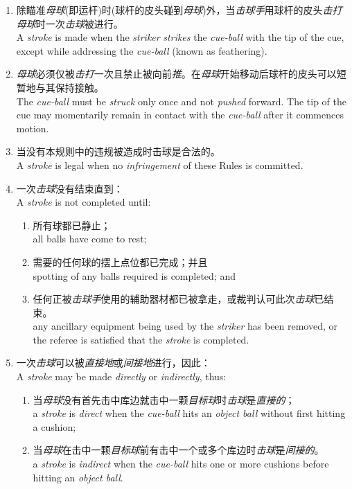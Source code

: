 \begin{enumerate}[label=(\alph*)]
    \item 除瞄准\emph{母球}(即运杆)时(球杆的皮头碰到\emph{母球})外，当\emph{击球手}用球杆的皮头\emph{击打}\emph{母球}时一次\emph{击球}被进行。\\
    A \emph{stroke} is made when the \emph{striker} \emph{strikes} the \emph{cue-ball} with the tip of the cue, except while addressing the \emph{cue-ball} (known as feathering).
    \item \emph{母球}必须仅被\emph{击打}一次且禁止被向前\emph{推}。在\emph{母球}开始移动后球杆的皮头可以短暂地与其保持接触。\\
    The \emph{cue-ball} must be \emph{struck} only once and not \emph{pushed} forward. The tip of the cue may momentarily remain in contact with the \emph{cue-ball} after it commences motion.
    \item 当没有本规则中的违规被造成时击球是合法的。\\
    A \emph{stroke} is legal when no \emph{infringement} of these Rules is committed.
    \item 一次\emph{击球}没有结束直到：\\
    A \emph{stroke} is not completed until:
    \begin{enumerate}[label=(\roman*)]
        \item 所有球都已静止；\\
        all balls have come to rest;
        \item 需要的任何球的摆上点位都已完成；并且\\
        spotting of any balls required is completed; and
        \item 任何正被\emph{击球手}使用的辅助器材都已被拿走，或裁判认可此次\emph{击球}已结束。\\
        any ancillary equipment being used by the \emph{striker} has been removed, or the referee is satisfied that the \emph{stroke} is completed.
    \end{enumerate}
    \item 一次\emph{击球}可以被\emph{直接地}或\emph{间接地}进行，因此：\\
    A \emph{stroke} may be made \emph{directly} or \emph{indirectly}, thus:
    \begin{enumerate}[label=(\roman*)]
        \item 当\emph{母球}没有首先击中库边就击中一颗\emph{目标球}时\emph{击球}是\emph{直接的}；\\
        a \emph{stroke} is \emph{direct} when the \emph{cue-ball} hits an \emph{object ball} without first hitting a cushion;
        \item 当\emph{母球}在击中一颗\emph{目标球}前有击中一个或多个库边时\emph{击球}是\emph{间接的}。\\
        a \emph{stroke} is \emph{indirect} when the \emph{cue-ball} hits one or more cushions before hitting an \emph{object ball}.
    \end{enumerate}
\end{enumerate}

